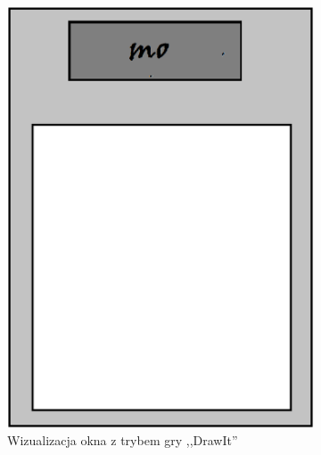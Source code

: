 \documentclass[15pt]{article}
\begin{document}
\begin{figure}[h!]
  \centering
  \begin{subfigure}[b]{0.35\linewidth}
    \includegraphics[width=\linewidth]{draw.png}
    \caption{Wizualizacja okna z trybem gry ,,DrawIt''}
  \end{subfigure}
  \begin{subfigure}[b]{0.35\linewidth}

\end{subfigure}
\end{figure}
\end{document}
